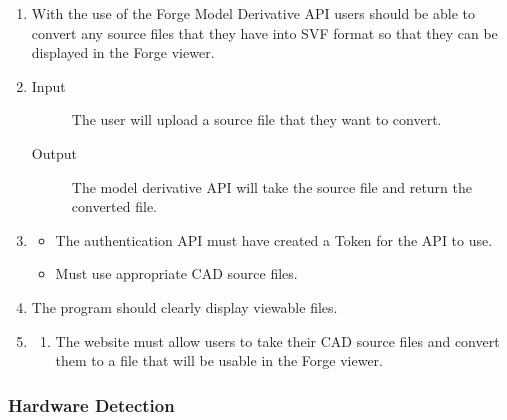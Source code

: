 \documentclass[letterpaper, 10pt, draftclsnofoot, compsoc, onecolumn]{IEEEtran}
\begin{document}
\begin{enumerate}
	\item With the use of the Forge Model Derivative API users should be able to convert any source files that they have into SVF format
	so that they can be displayed in the Forge viewer.
	
	\item
	\begin{description}
		\item[Input] The user will upload a source file that they want to convert. 
		\item[Output] The model derivative API will take the source file and return the converted file.
	\end{description}

	\item
	\begin{itemize}
		\item The authentication API must have created a Token for the API to use.
		\item Must use appropriate CAD source files. 
	\end{itemize}

	\item The program should clearly display viewable files.

	\item
	\begin{enumerate}
		\item The website must allow users to take their CAD source files and convert them to a file that will be usable in the
	Forge viewer. 
	\end{enumerate}   
\end{enumerate}

\subsubsection{Hardware Detection}
\end{document}
